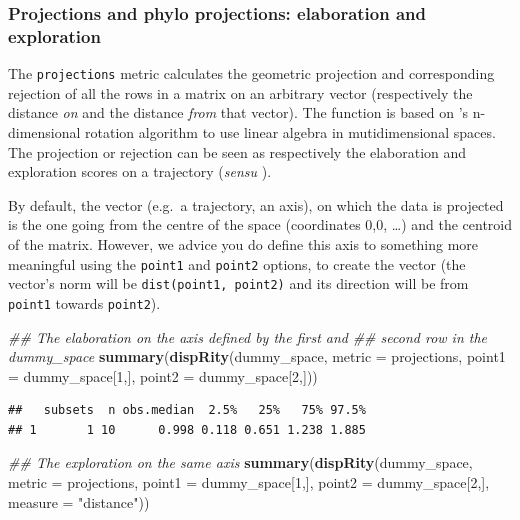 \documentclass[]{book}
\newenvironment{Shaded}{\begin{snugshade}}{\end{snugshade}}
\newcommand{\CommentTok}[1]{\textcolor[rgb]{0.56,0.35,0.01}{\textit{#1}}}
\newcommand{\DataTypeTok}[1]{\textcolor[rgb]{0.13,0.29,0.53}{#1}}
\newcommand{\DecValTok}[1]{\textcolor[rgb]{0.00,0.00,0.81}{#1}}
\newcommand{\KeywordTok}[1]{\textcolor[rgb]{0.13,0.29,0.53}{\textbf{#1}}}
\newcommand{\NormalTok}[1]{#1}
\newcommand{\StringTok}[1]{\textcolor[rgb]{0.31,0.60,0.02}{#1}}
\begin{document}
\hypertarget{projections-and-phylo-projections-elaboration-and-exploration}{%
\subsubsection{Projections and phylo projections: elaboration and exploration}\label{projections-and-phylo-projections-elaboration-and-exploration}}

The \texttt{projections} metric calculates the geometric projection and corresponding rejection of all the rows in a matrix on an arbitrary vector (respectively the distance \emph{on} and the distance \emph{from} that vector). The function is based on \citet{aguilera2004}'s n-dimensional rotation algorithm to use linear algebra in mutidimensional spaces. The projection or rejection can be seen as respectively the elaboration and exploration scores on a trajectory (\emph{sensu} \citet{endler2005}).

By default, the vector (e.g.~a trajectory, an axis), on which the data is projected is the one going from the centre of the space (coordinates 0,0, \ldots{}) and the centroid of the matrix.
However, we advice you do define this axis to something more meaningful using the \texttt{point1} and \texttt{point2} options, to create the vector (the vector's norm will be \texttt{dist(point1,\ point2)} and its direction will be from \texttt{point1} towards \texttt{point2}).

\begin{Shaded}
\begin{Highlighting}[]
\CommentTok{## The elaboration on the axis defined by the first and}
\CommentTok{## second row in the dummy_space}
\KeywordTok{summary}\NormalTok{(}\KeywordTok{dispRity}\NormalTok{(dummy_space, }\DataTypeTok{metric =}\NormalTok{ projections,}
                              \DataTypeTok{point1 =}\NormalTok{ dummy_space[}\DecValTok{1}\NormalTok{,],}
                              \DataTypeTok{point2 =}\NormalTok{ dummy_space[}\DecValTok{2}\NormalTok{,]))}
\end{Highlighting}
\end{Shaded}

\begin{verbatim}
##   subsets  n obs.median  2.5%   25%   75% 97.5%
## 1       1 10      0.998 0.118 0.651 1.238 1.885
\end{verbatim}

\begin{Shaded}
\begin{Highlighting}[]
\CommentTok{## The exploration on the same axis}
\KeywordTok{summary}\NormalTok{(}\KeywordTok{dispRity}\NormalTok{(dummy_space, }\DataTypeTok{metric =}\NormalTok{ projections,}
                              \DataTypeTok{point1 =}\NormalTok{ dummy_space[}\DecValTok{1}\NormalTok{,],}
                              \DataTypeTok{point2 =}\NormalTok{ dummy_space[}\DecValTok{2}\NormalTok{,],}
                              \DataTypeTok{measure =} \StringTok{"distance"}\NormalTok{))}
\end{Highlighting}
\end{Shaded}
\end{document}
